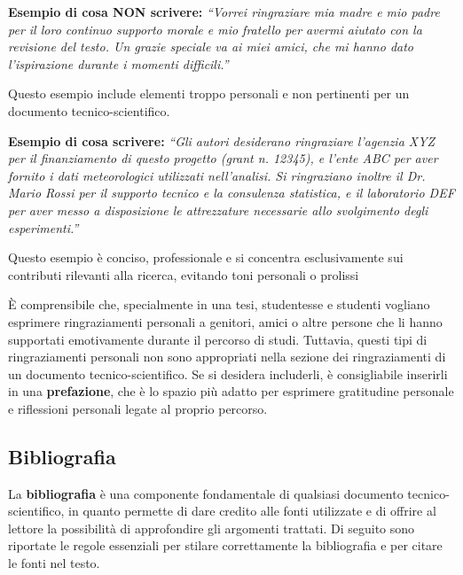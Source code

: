 \documentclass[9pt,a4paper,twoside]{rho-class/rho}
\begin{document}
\begin{info}
\textbf{Esempio di cosa NON scrivere:}
\textit{“Vorrei ringraziare mia madre e mio padre per il loro continuo supporto morale e mio fratello per avermi aiutato con la revisione del testo. Un grazie speciale va ai miei amici, che mi hanno dato l’ispirazione durante i momenti difficili.”}

Questo esempio include elementi troppo personali e non pertinenti per un documento tecnico-scientifico.

\textbf{Esempio di cosa scrivere:}
\textit{“Gli autori desiderano ringraziare l’agenzia XYZ per il finanziamento di questo progetto (grant n. 12345), e l’ente ABC per aver fornito i dati meteorologici utilizzati nell’analisi. Si ringraziano inoltre il Dr. Mario Rossi per il supporto tecnico e la consulenza statistica, e il laboratorio DEF per aver messo a disposizione le attrezzature necessarie allo svolgimento degli esperimenti.”}

Questo esempio è conciso, professionale e si concentra esclusivamente sui contributi rilevanti alla ricerca, evitando toni personali o prolissi
\end{info}

È comprensibile che, specialmente in una tesi, studentesse e studenti vogliano esprimere ringraziamenti personali a genitori, amici o altre persone che li hanno supportati emotivamente durante il percorso di studi. Tuttavia, questi tipi di ringraziamenti personali non sono appropriati nella sezione dei ringraziamenti di un documento tecnico-scientifico. Se si desidera includerli, è consigliabile inserirli in una \textbf{prefazione}, che è lo spazio più adatto per esprimere gratitudine personale e riflessioni personali legate al proprio percorso.

\subsection{Bibliografia}    
La \textbf{bibliografia} è una componente fondamentale di qualsiasi documento tecnico-scientifico, in quanto permette di dare credito alle fonti utilizzate e di offrire al lettore la possibilità di approfondire gli argomenti trattati. Di seguito sono riportate le regole essenziali per stilare correttamente la bibliografia e per citare le fonti nel testo.
\end{document}
